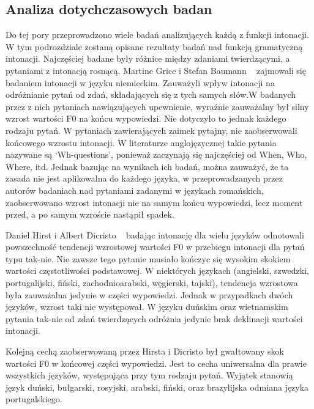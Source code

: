 \documentclass[a4paper,12 pt]{article}
\begin{document}
 

\subsection{Analiza dotychczasowych badan}
Do tej pory przeprowadzono wiele badań analizujących każdą z funkcji intonacji. W tym podrozdziale zostaną opisane rezultaty badań nad funkcją gramatyczną intonacji. Najczęściej badane były różnice między zdaniami twierdzącymi, a pytaniami z intonacją rosnącą.
\leavevmode
\newline
Martine Grice i Stefan Baumann ~\cite{GRI-BA} zajmowali się badaniem intonacji w języku niemieckim. Zauważyli wpływ intonacji na odróżnianie pytań od zdań, składających się z tych samych słów.W badanych przez z nich pytaniach nawiązujących upewnienie, wyraźnie zauważalny był silny wzrost wartości F0 na końcu wypowiedzi. Nie dotyczyło to jednak każdego rodzaju pytań. W pytaniach zawierających zaimek pytajny, nie zaobserwowali końcowego wzrostu intonacji. W literaturze anglojęzycznej takie pytania nazywane są `Wh-questions', ponieważ zaczynają się najczęściej od When, Who, Where, itd. Jednak bazując na wynikach ich badań, można zauważyć, że ta zasada nie jest aplikowalna do każdego języka, w przeprowadzanych przez autorów badaniach nad pytaniami zadanymi w językach romańskich, zaobserwowano wzrost intonacji nie na samym końcu wypowiedzi, lecz moment przed, a po samym wzroście nastąpił spadek.
\leavevmode
\newline

Daniel Hirst i Albert Dicristo ~\cite{INT-SYS} badając intonację dla wielu języków odnotowali powszechność tendencji wzrostowej wartości F0 w przebiegu intonacji dla pytań typu tak-nie. Nie zawsze tego pytanie musiało kończyc się wysokim skokiem wartości częstotliwości podstawowej. W niektórych językach (angielski, szwedzki, portugalijski, fiński, zachodnioarabski, węgierski, tajski), tendencja wzrostowa była zauważalna jedynie w części wypowiedzi.
Jednak w przypadkach dwóch języków, wzrost taki nie występował. W języku duńskim oraz wietnamskim pytania tak-nie od zdań twierdzących odróżnia jedynie brak deklinacji wartości intonacji.

Kolejną cechą zaobserwowaną przez Hirsta i Dicristo był gwałtowany skok wartości F0 w końcowej części wypowiedzi. Jest to cecha uniwersalna dla prawie wszystkich języków, występująca przy tym rodzaju pytań. Wyjątek stanowią język duński, bułgarski, rosyjski, arabski, fiński, oraz brazylijska odmiana języka portugalskiego.
\end{document}
